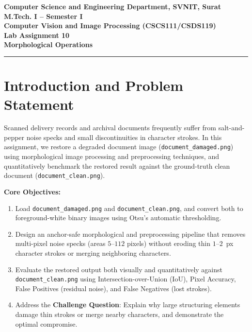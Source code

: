 \documentclass[12pt]{article}
\begin{document}

\begin{center}
\textbf{Computer Science and Engineering Department, SVNIT, Surat}\\
\textbf{M.Tech. I -- Semester I}\\
\textbf{Computer Vision and Image Processing (CSCS111/CSDS119)}\\
\textbf{Lab Assignment 10}\\
\textbf{Morphological Operations}
\end{center}
\vspace{-4pt}
\hrule
\vspace{6pt}

\section{Introduction and Problem Statement}
Scanned delivery records and archival documents frequently suffer from salt-and-pepper noise specks and small discontinuities in character strokes. In this assignment, we restore a degraded document image (\texttt{document\_damaged.png}) using morphological image processing and preprocessing techniques, and quantitatively benchmark the restored result against the ground-truth clean document (\texttt{document\_clean.png}).

\textbf{Core Objectives:}
\begin{enumerate}
    \item Load \texttt{document\_damaged.png} and \texttt{document\_clean.png}, and convert both to foreground-white binary images using Otsu's automatic thresholding.
    \item Design an anchor-safe morphological and preprocessing pipeline that removes multi-pixel noise specks (areas $5$--$112$ pixels) without eroding thin $1$--$2$~px character strokes or merging neighboring characters.
    \item Evaluate the restored output both visually and quantitatively against \texttt{document\_clean.png} using Intersection-over-Union (IoU), Pixel Accuracy, False Positives (residual noise), and False Negatives (lost strokes).
    \item Address the \textbf{Challenge Question}: Explain why large structuring elements damage thin strokes or merge nearby characters, and demonstrate the optimal compromise.
\end{enumerate}
\end{document}
